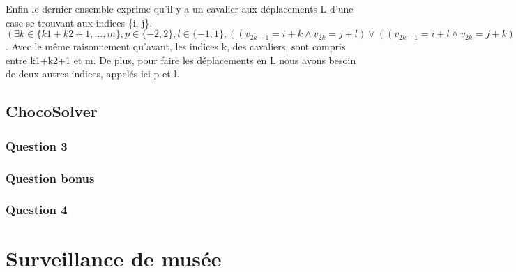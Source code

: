 \documentclass{article}
\begin{document}
Enfin le dernier ensemble exprime qu'il y a un cavalier aux déplacements L d'une case se trouvant aux indices \{i, j\}, $(\exists k \in \{k1+k2+1, ..., m\}, p \in \{-2, 2 \}, l \in \{-1, 1\}, ((v_{2k-1} = i+k \wedge v_{2k} = j+l)  \vee ((v_{2k-1} = i+l \wedge v_{2k} = j+k))))$. Avec le même raisonnement qu'avant, les indices k, des cavaliers, sont compris entre k1+k2+1 et m. De plus, pour faire les déplacements en L nous avons besoin de deux autres indices, appelés ici p et l.

\subsection{ChocoSolver}
\subsubsection{Question 3}

\subsubsection{Question bonus}

\subsubsection{Question 4}

\section{Surveillance de musée}
\end{document}
